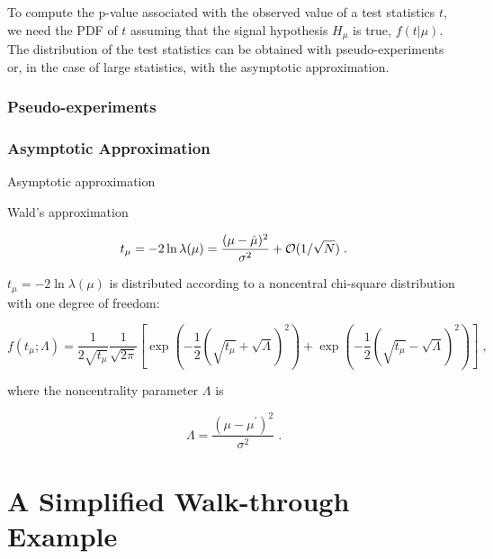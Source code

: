 To compute the p-value associated with the observed value of a test statistics $t$, we need the PDF of $t$ assuming that the signal hypothesis $H_\mu$ is true, $ f(t | \mu ) $. The distribution of the test statistics can be obtained with pseudo-experiments or, in the case of large statistics, with the asymptotic approximation. 

\subsubsection*{Pseudo-experiments}


\subsubsection*{Asymptotic Approximation}
Asymptotic approximation \cite{Cowan2011}

\noindent Wald's approximation \cite{Wald1943}

\begin{equation}
\label{eq:wald}
t_{\mu} = -2 \ln \lambda(\mu)
= \frac{(\mu - \hat{\mu})^2}{\sigma^2} + {\cal  O}(1/\sqrt{N}) \;.
\end{equation}

 $t_{\mu} = -2 \ln \lambda(\mu)$ is distributed according to a noncentral chi-square distribution with one degree of freedom:

\begin{equation}
\label{eq:stat:ftmulambda}
f(t_{\mu};\Lambda) = \frac{1}{2 \sqrt{t_{\mu}}} \frac{1}{\sqrt{2 \pi}}
\left[ \exp \left( - \frac{1}{2}
\left( \sqrt{t_{\mu}} + \sqrt{\Lambda} \right)^2 \right) +
\exp \left( - \frac{1}{2} \left( \sqrt{t_{\mu}} - \sqrt{\Lambda} \right)^2
\right) \right] \;,
\end{equation}

\noindent where the noncentrality parameter $\Lambda$ is

\begin{equation}
\label{eq:stat:noncentrality}
\Lambda = \frac{(\mu - \mu^{\prime})^2}{\sigma^2} \;.
\end{equation}


\section{A Simplified Walk-through Example}

